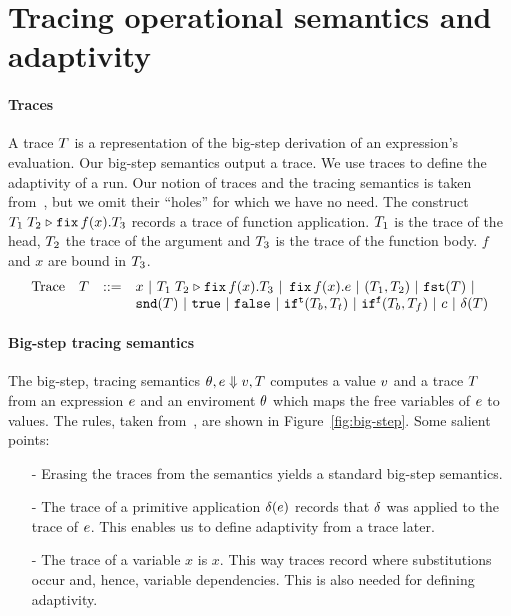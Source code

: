 \documentclass[a4paper,11pt]{article}
\theoremstyle{definition}
\begin{document}



\section{Tracing operational semantics and adaptivity}

\paragraph{Traces}
A trace $T$ is a representation of the big-step derivation of an
expression's evaluation. Our big-step semantics output a trace. We use
traces to define the adaptivity of a run. Our notion of traces and the
tracing semantics is taken from~\cite[Section 4]{perera:dep}, but we
omit their ``holes'' for which we have no need. The construct
$T_1 \; T_2 \mathrel{\triangleright} {\mathop{\mathtt{fix}} f(x).T_3}$ records a trace of function
application. $T_1$ is the trace of the head, $T_2$ the trace of
the argument and $T_3$ is the trace of the function body. $f$ and
$x$ are bound in $T_3$.
%
\[\begin{array}{llll}
\mbox{Trace} & \tr & ::= & x ~|~ \trapp{\tr_1}{\tr_2}{f}{x}{\tr_3} ~|~
\trfix f(x).e ~|~ (\tr_1, \tr_2) ~|~ \trprojl(\tr) ~|\\ 
%
& & & \trprojr(\tr) ~|~ \trtrue ~|~ \trfalse ~|~ \trift(\tr_b, \tr_t)
~|~ \triff(\tr_b, \tr_f) ~|~ \trconst ~|~ \trop(\tr)
\end{array}\]


\paragraph{Big-step tracing semantics}
The big-step, tracing semantics $\theta, e \mathrel{\Downarrow} v, T$
computes a value $v$ and a trace $T$ from an expression $e$
and an enviroment $\theta$ which maps the free variables of $e$ to
values. The rules, taken from~\cite{perera:dep}, are shown in
Figure~\ref{fig:big-step}. Some salient points:
\begin{itemize}
\item[-] Erasing the traces from the semantics yields a standard
  big-step semantics.
\item[-] The trace of a primitive application $\delta(e)$
  records that $\delta$ was applied to the trace of
  $e$. This enables us to define adaptivity from a trace later.
\item[-] The trace of a variable $x$ is $x$. This way traces record
  where substitutions occur and, hence, variable dependencies. This is
  also needed for defining adaptivity.
\end{itemize}
\end{document}

